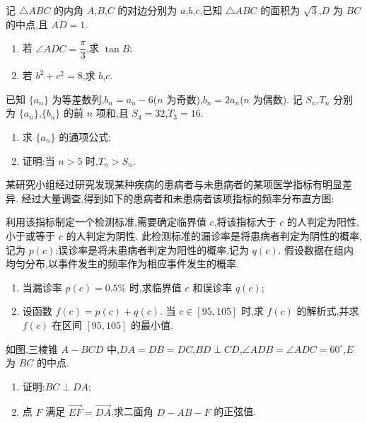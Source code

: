 \begin{problem}
记 \(\triangle ABC\) 的内角 \(A\),\(B\),\(C\) 的对边分别为 \(a\),\(b\),\(c\),已知 \(\triangle ABC\) 的面积为 \(\sqrt3\),\(D\) 为 \(BC\) 的中点,且 \(AD=1\).

\begin{enumerate}
\item 若 \(\angle ADC=\dfrac{\pi}{3}\),求 \(\tan B\);
\item 若 \(b^2+c^2=8\),求 \(b\),\(c\).
\end{enumerate}
\end{problem}

\begin{problem}
已知 \(\{a_n\}\) 为等差数列,\(b_n=a_n-6\)(\(n\) 为奇数),\(b_n=2a_n\)(\(n\) 为偶数). 记 \(S_n\),\(T_n\) 分别为 \(\{a_n\}\),\(\{b_n\}\) 的前 \(n\) 项和,且 \(S_4=32\),\(T_3=16\).

\begin{enumerate}
\item 求 \(\{a_n\}\) 的通项公式;
\item 证明:当 \(n>5\) 时,\(T_n>S_n\).
\end{enumerate}
\end{problem}

\begin{problem}
某研究小组经过研究发现某种疾病的患病者与未患病者的某项医学指标有明显差异. 经过大量调查,得到如下的患病者和未患病者该项指标的频率分布直方图:

利用该指标制定一个检测标准,需要确定临界值 \(c\),将该指标大于 \(c\) 的人判定为阳性,小于或等于 \(c\) 的人判定为阴性. 此检测标准的漏诊率是将患病者判定为阴性的概率,记为 \(p(c)\);误诊率是将未患病者判定为阳性的概率,记为 \(q(c)\). 假设数据在组内均匀分布,以事件发生的频率作为相应事件发生的概率.
\begin{enumerate}
\item 当漏诊率 \(p(c)=0.5\%\) 时,求临界值 \(c\) 和误诊率 \(q(c)\);
\item 设函数 \(f(c)=p(c)+q(c)\). 当 \(c\in[95,105]\) 时,求 \(f(c)\) 的解析式,并求 \(f(c)\) 在区间 \([95,105]\) 的最小值.
\end{enumerate}

\begin{center}
\end{center}
\end{problem}

\begin{problem}
如图,三棱锥 \(A-BCD\) 中,\(DA=DB=DC\),\(BD\perp CD\),\(\angle ADB=\angle ADC=60^\circ\),\(E\) 为 \(BC\) 的中点.

\begin{enumerate}
\item 证明:\(BC\perp DA\);
\item 点 \(F\) 满足 \(\overrightarrow{EF}=\overrightarrow{DA}\),求二面角 \(D-AB-F\) 的正弦值.
\end{enumerate}

\end{problem}

